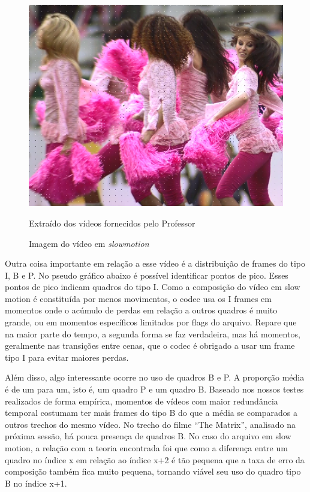 \begin{figure}[H]
    \centering
    \caption{Imagem do vídeo em \textit{slowmotion}}
    \label{fig:imagem9}
    
    \includegraphics[scale=0.5]{Documeto/1-ElementosTextuais/images/09.png}

    \small
    Extraído dos vídeos fornecidos pelo Professor
\end{figure}

\paragrafo Outra coisa importante em relação a esse vídeo é a distribuição de frames do tipo I, B e P. No pseudo gráfico abaixo é possível identificar pontos de pico. Esses pontos de pico indicam quadros do tipo I. Como a composição do vídeo em slow motion é constituída por menos movimentos, o codec usa os I frames em momentos onde o acúmulo de perdas em relação a outros quadros é muito grande, ou em momentos específicos limitados por flags do arquivo. Repare que na maior parte do tempo, a segunda forma se faz verdadeira, mas há momentos, geralmente nas transições entre cenas, que o codec é obrigado a usar um frame tipo I para evitar maiores perdas.

\paragrafo Além disso, algo interessante ocorre no uso de quadros B e P. A proporção média é de um para um, isto é, um quadro P e um quadro B. Baseado nos nossos testes realizados de forma empírica, momentos de vídeos com maior redundância temporal costumam ter mais frames do tipo B do que a média se comparados a outros trechos do mesmo vídeo. No trecho do filme “The Matrix”, analisado na próxima sessão, há pouca presença de quadros B. No caso do arquivo em slow motion, a relação com a teoria encontrada foi que como a diferença entre um quadro no índice x em relação ao índice x+2 é tão pequena que a taxa de erro da composição também fica muito pequena, tornando viável seu uso do quadro tipo B no índice x+1.

